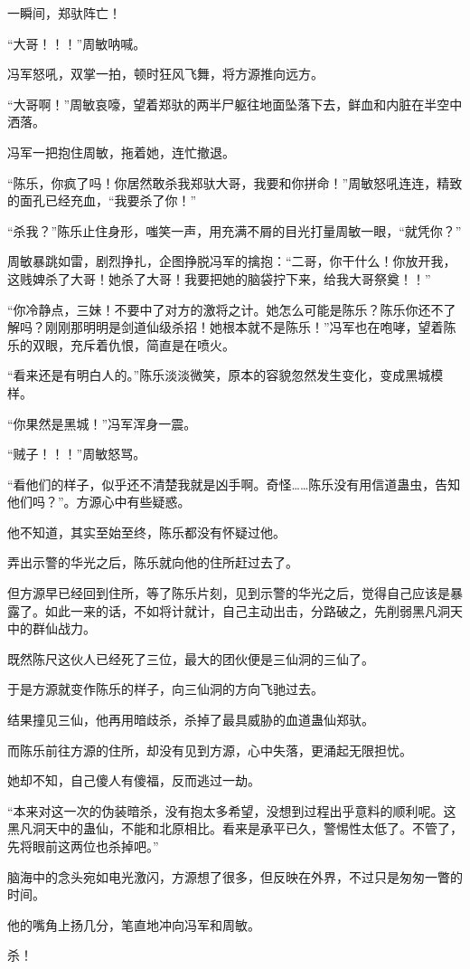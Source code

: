 \begin{this_body}
一瞬间，郑驮阵亡！

“大哥！！！”周敏呐喊。

冯军怒吼，双掌一拍，顿时狂风飞舞，将方源推向远方。

“大哥啊！”周敏哀嚎，望着郑驮的两半尸躯往地面坠落下去，鲜血和内脏在半空中洒落。

冯军一把抱住周敏，拖着她，连忙撤退。

“陈乐，你疯了吗！你居然敢杀我郑驮大哥，我要和你拼命！”周敏怒吼连连，精致的面孔已经充血，“我要杀了你！”

“杀我？”陈乐止住身形，嗤笑一声，用充满不屑的目光打量周敏一眼，“就凭你？”

周敏暴跳如雷，剧烈挣扎，企图挣脱冯军的擒抱：“二哥，你干什么！你放开我，这贱婢杀了大哥！她杀了大哥！我要把她的脑袋拧下来，给我大哥祭奠！！”

“你冷静点，三妹！不要中了对方的激将之计。她怎么可能是陈乐？陈乐你还不了解吗？刚刚那明明是剑道仙级杀招！她根本就不是陈乐！”冯军也在咆哮，望着陈乐的双眼，充斥着仇恨，简直是在喷火。

“看来还是有明白人的。”陈乐淡淡微笑，原本的容貌忽然发生变化，变成黑城模样。

“你果然是黑城！”冯军浑身一震。

“贼子！！！”周敏怒骂。

“看他们的样子，似乎还不清楚我就是凶手啊。奇怪……陈乐没有用信道蛊虫，告知他们吗？”。方源心中有些疑惑。

他不知道，其实至始至终，陈乐都没有怀疑过他。

弄出示警的华光之后，陈乐就向他的住所赶过去了。

但方源早已经回到住所，等了陈乐片刻，见到示警的华光之后，觉得自己应该是暴露了。如此一来的话，不如将计就计，自己主动出击，分路破之，先削弱黑凡洞天中的群仙战力。

既然陈尺这伙人已经死了三位，最大的团伙便是三仙洞的三仙了。

于是方源就变作陈乐的样子，向三仙洞的方向飞驰过去。

结果撞见三仙，他再用暗歧杀，杀掉了最具威胁的血道蛊仙郑驮。

而陈乐前往方源的住所，却没有见到方源，心中失落，更涌起无限担忧。

她却不知，自己傻人有傻福，反而逃过一劫。

“本来对这一次的伪装暗杀，没有抱太多希望，没想到过程出乎意料的顺利呢。这黑凡洞天中的蛊仙，不能和北原相比。看来是承平已久，警惕性太低了。不管了，先将眼前这两位也杀掉吧。”

脑海中的念头宛如电光激闪，方源想了很多，但反映在外界，不过只是匆匆一瞥的时间。

他的嘴角上扬几分，笔直地冲向冯军和周敏。

杀！

\end{this_body}

